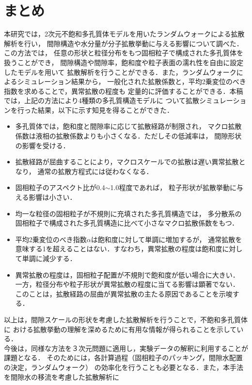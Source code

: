 \documentclass{jsce}
\begin{document}
\section{まとめ}
本研究では，2次元不飽和多孔質体モデルを用いたランダムウォークによる拡散解析を行い，
間隙構造や水分量が分子拡散挙動に与える影響について調べた．この方法では，
任意の形状と粒径分布をもつ固相粒子で構成された多孔質体を扱うことができ，
間隙構造や間隙率，飽和度や粒子表面の濡れ性を自由に設定したモデルを用いて
拡散解析を行うことができる．また，ランダムウォークによるシミュレーション結果から，
一般化された拡散係数と，平均2乗変位のべき指数を求めることで，異常拡散の程度も
定量的に評価することができる．本稿では，上記の方法により4種類の多孔質構造モデルに
ついて拡散シミュレーションを行った結果，以下に示す知見を得ることができた．
\begin{itemize}
\item
	多孔質体では，飽和度と間隙率に応じて拡散経路が制限され，
	マクロ拡散係数は液相の拡散係数よりも小さくなる．ただしその低減率は，
	間隙形状の影響を受ける．
\item
	拡散経路が屈曲することにより，マクロスケールでの拡散は遅い異常拡散となり，
	通常の拡散方程式には従わなくなる．
\item
	固相粒子のアスペクト比が0.4$\sim$1.0程度であれば，
	粒子形状が拡散挙動に与える影響は小さい．
\item
	均一な粒径の固相粒子が不規則に充填された多孔質構造では，
	多分散系の固相粒子で構成された多孔質構造に比べて小さなマクロ拡散係数をもつ．
\item
	平均2乗変位のべき指数$\alpha$は飽和度に対して単調に増加するが，
	通常拡散を意味する1を超えることはない．すなわち，異常拡散の程度は飽和度に対して単調に減少する．
\item
	異常拡散の程度は，固相粒子配置が不規則で飽和度が低い場合に大きい．
	一方，粒径分布や粒子形状が異常拡散の程度に当てる影響は顕著でない．
	このことは，拡散経路の屈曲が異常拡散の主たる原因であることを示唆する．
\end{itemize}
以上は，間隙スケールの形状を考慮した拡散解析を行うことで，不飽和多孔質体に
おける拡散挙動の理解を深めるために有用な情報が得られることを示している．\\
\hspace{\parindent}
今後は，同様な方法を３次元問題に適用し，実験データの解釈に利用することが課題となる．
そのためには，各計算過程（固相粒子のパッキング，間隙水配置の決定，ランダムウォーク）
の効率化を行うことも必要となる．また，本手法を間隙水の移流を考慮した拡散解析に
\end{document}
